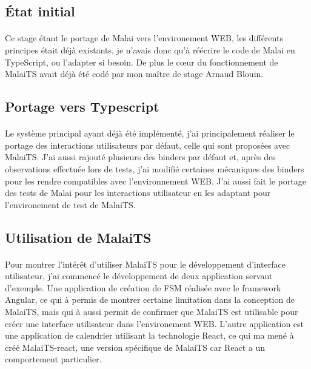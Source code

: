 \documentclass[11pt, a4paper, pdftex]{article}
\begin{document}
        \subsection{État initial}\label{subsec:travinit}
            \paragraph{}
                Ce stage étant le portage de Malai vers l'environement WEB, les différents principes était déjà existants, je n'avais donc qu'à réécrire le code de Malai en TypeScript, ou l'adapter si besoin.
                De plus le c\oe ur du fonctionnement de MalaiTS avait déjà été codé par mon maître de stage Arnaud Blouin.

        \subsection{Portage vers Typescript}\label{subsec:mainjob}
            \paragraph{}
                Le système principal ayant déjà été implémenté, j'ai principalement réaliser le portage des interactions utilisateurs par défaut, celle qui sont proposées avec MalaiTS\@.
                J'ai aussi rajouté plusieurs des binders par défaut et, après des observations effectuée lors de tests, j'ai modifié certaines mécaniques
                des binders pour les rendre compatibles avec l'environnement WEB\@.
                J'ai aussi fait le portage des tests de Malai pour les interactions utilisateur en les adaptant pour l'environement de test de MalaiTS\@.

        \subsection{Utilisation de MalaiTS}\label{subsec:travexem}
            \paragraph{}
                Pour montrer l'intérêt d'utiliser MalaiTS pour le développement d'interface utilisateur, j'ai commencé le développement de deux application servant d'exemple.
                Une application de création de FSM réalisée avec le framework Angular, ce qui à permis de montrer certaine limitation dans la conception de MalaiTS,
                mais qui à aussi permit de confirmer que MalaiTS est utilisable pour créer une interface utilisateur dans l'environement WEB\@.
                L'autre application est une application de calendrier utilisant la technologie React, ce qui ma mené à créé MalaiTS-react, une version spécifique de MalaiTS car React a un comportement particulier.
\end{document}
